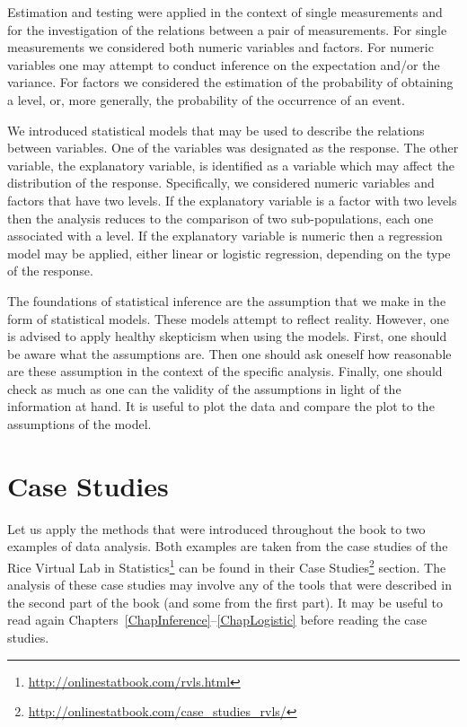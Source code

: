 \documentclass[
]{krantz}
\renewcommand{\href}[2]{#2\footnote{\url{#1}}}
\theoremstyle{definition}
\theoremstyle{definition}
\theoremstyle{definition}
\theoremstyle{remark}
\begin{document}
Estimation and testing were applied in the context of single
measurements and for the investigation of the relations between a pair
of measurements. For single measurements we considered both numeric
variables and factors. For numeric variables one may attempt to conduct
inference on the expectation and/or the variance. For factors we
considered the estimation of the probability of obtaining a level, or,
more generally, the probability of the occurrence of an event.

We introduced statistical models that may be used to describe the
relations between variables. One of the variables was designated as the
response. The other variable, the explanatory variable, is identified as
a variable which may affect the distribution of the response.
Specifically, we considered numeric variables and factors that have two
levels. If the explanatory variable is a factor with two levels then the
analysis reduces to the comparison of two sub-populations, each one
associated with a level. If the explanatory variable is numeric then a
regression model may be applied, either linear or logistic regression,
depending on the type of the response.

The foundations of statistical inference are the assumption that we make
in the form of statistical models. These models attempt to reflect
reality. However, one is advised to apply healthy skepticism when using
the models. First, one should be aware what the assumptions are. Then
one should ask oneself how reasonable are these assumption in the
context of the specific analysis. Finally, one should check as much as
one can the validity of the assumptions in light of the information at
hand. It is useful to plot the data and compare the plot to the
assumptions of the model.

\hypertarget{case-studies}{%
\section{Case Studies}\label{case-studies}}

Let us apply the methods that were introduced throughout the book to two
examples of data analysis. Both examples are taken from the case studies
of the \href{http://onlinestatbook.com/rvls.html}{Rice Virtual Lab in
Statistics} can be found in their
\href{http://onlinestatbook.com/case_studies_rvls/}{Case Studies} section.
The analysis of these case studies may involve any of the tools that
were described in the second part of the book (and some from the first
part). It may be useful to read again
Chapters~\ref{ChapInference}--\ref{ChapLogistic} before reading the case
studies.
\end{document}
